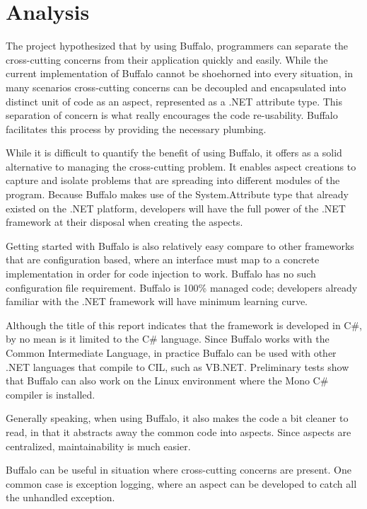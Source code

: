 \chapter{Analysis}

The project hypothesized that by using Buffalo, programmers can separate the cross-cutting concerns from their application quickly and easily. While the current implementation of Buffalo cannot be shoehorned into every situation, in many scenarios cross-cutting concerns can be decoupled and encapsulated into distinct unit of code as an aspect, represented as a .NET attribute type. This separation of concern is what really encourages the code re-usability. Buffalo facilitates this process by providing the necessary plumbing. 

While it is difficult to quantify the benefit of using Buffalo, it offers as a solid alternative to managing the cross-cutting problem. It enables aspect creations to capture and isolate problems that are spreading into different modules of the program. Because Buffalo makes use of the System.Attribute type that already existed on the .NET platform, developers will have the full power of the .NET framework at their disposal when creating the aspects. 

Getting started with Buffalo is also relatively easy compare to other frameworks that are configuration based, where an interface must map to a concrete implementation in order for code injection to work. Buffalo has no such configuration file requirement. Buffalo is 100\% managed code; developers already familiar with the .NET framework will have minimum learning curve.

Although the title of this report indicates that the framework is developed in C\#, by no mean is it limited to the C\# language. Since Buffalo works with the Common Intermediate Language, in practice Buffalo can be used with other .NET languages that compile to CIL, such as VB.NET. Preliminary tests show that Buffalo can also work on the Linux environment where the Mono C\# compiler is installed.

Generally speaking, when using Buffalo, it also makes the code a bit cleaner to read, in that it abstracts away the common code into aspects. Since aspects are centralized, maintainability is much easier. 

Buffalo can be useful in situation where cross-cutting concerns are present. One common case is exception logging, where an aspect can be developed to catch all the unhandled exception.

